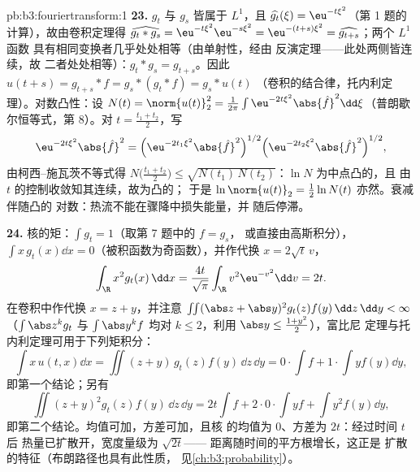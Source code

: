 \begin{solution}{pb:b3:fouriertransform:1}
\textbf{23.} $g_t$ 与 $g_s$ 皆属于 $L^1$，且
$\widehat{g_t}(\xi) = \eu^{-t\xi^2}$（第 1 题的
计算），故由卷积定理得
$\widehat{g_t * g_s} = \eu^{-t\xi^2}\eu^{-s\xi^2} =
\eu^{-(t+s)\xi^2} = \widehat{g_{t+s}}$；两个 $L^1$ 函数
具有相同变换者几乎处处相等（由单射性，经由
反演定理——此处两侧皆连续，故
二者处处相等）：$g_t * g_s = g_{t+s}$。因此
$u(t + s) = g_{t+s} * f = g_s * (g_t * f) = g_s * u(t)$
（卷积的结合律，托内利定理）。对数凸性：设
$N(t) = \norm{u(t)}_2^2 = \frac1{2\pi}\int
\eu^{-2t\xi^2}\abs{\hat f}^2\dd\xi$（普朗歇尔恒等式，第
8）。对 $t = \frac{t_1 + t_2}2$，写
\[
\eu^{-2t\xi^2}\abs{\hat f}^2
= \Bigl(\eu^{-2t_1\xi^2}\abs{\hat f}^2\Bigr)^{1/2}
\Bigl(\eu^{-2t_2\xi^2}\abs{\hat f}^2\Bigr)^{1/2},
\]
由柯西–施瓦茨不等式得 $N\bigl(\frac{t_1+t_2}2\bigr) \leq
\sqrt{N(t_1)\,N(t_2)}$：$\ln N$ 为中点凸的，且
由 $t$ 的控制收敛知其连续，故为凸的；
于是 $\ln\norm{u(t)}_2 = \frac12\ln N(t)$ 亦然。衰减伴随凸的
对数：热流不能在骤降中损失能量，并
随后停滞。

\textbf{24.} 核的矩：$\int g_t = 1$（取第 7 题中的 $f = g_s$，
或直接由高斯积分），$\int
x\,g_t(x)\dd x = 0$（被积函数为奇函数），并作代换 $x =
2\sqrt t\,v$，
\[
\int_\R x^2g_t(x)\,\dd x
= \frac{4t}{\sqrt\pi}\int_\R v^2\eu^{-v^2}\dd v = 2t .
\]
在卷积中作代换 $x = z + y$，并注意
$\iint(\abs z + \abs y)^2g_t(z)f(y)\,\dd z\,\dd y < \infty$
（$\int\abs z^kg_t$ 与 $\int\abs y^kf$ 均对 $k
\leq 2$，利用 $\abs y \leq \frac{1 + y^2}2$），富比尼
定理与托内利定理可用于下列矩积分：
\[
\int x\,u(t,x)\dd x = \iint (z + y)\,g_t(z)f(y)\,\dd z\,\dd
y = 0\cdot\!\int\! f + 1\cdot\!\int\! yf(y)\dd y,
\]
即第一个结论；另有
\[
\iint (z+y)^2g_t(z)f(y)\,\dd z\,\dd y
= 2t\int f + 2\cdot0\cdot\!\int\! yf + \int y^2f(y)\dd y ,
\]
即第二个结论。均值可加，方差可加，且核
的均值为 $0$、方差为 $2t$：经过时间 $t$ 后
热量已扩散开，宽度量级为 $\sqrt{2t}$——
距离随时间的平方根增长，这正是
扩散的特征（布朗路径也具有此性质，
见\cref{ch:b3:probability}）。


\end{solution}
